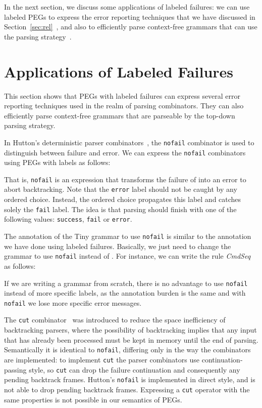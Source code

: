 \documentclass[3p,12pt,singlecolumn]{elsarticle}
\begin{document}
In the next
section, we discuss some applications of labeled failures:
we can use labeled PEGs to express the error
reporting techniques that we have discussed in
Section~\ref{sec:rel}~\cite{hutton1992hfp,rojemo1995epc,partridge1996fv,leijen2001parsec}, and also to efficiently parse
context-free grammars that can use the
 parsing strategy~\cite{parr2011llstar}.


\section{Applications of Labeled Failures}
\label{sec:labelsrelated}

This section shows that PEGs with labeled failures can express
several error reporting techniques used in the realm of parsing
combinators. They can also efficiently parse
context-free grammars that
are parseable by the  top-down parsing strategy.

In Hutton's deterministic parser combinators~\cite{hutton1992hfp}, the \texttt{nofail}
combinator is used to distinguish between failure and error.
We can express the \texttt{nofail} combinators using PEGs with labels
as follows:


That is, \texttt{nofail} is an expression that transforms the failure
of  into an error to abort backtracking.
Note that the \texttt{error} label should not be caught by any
ordered choice.
Instead, the ordered choice propagates this label and catches solely
the \texttt{fail} label.
The idea is that parsing should finish with one of the following
values: \texttt{success}, \texttt{fail} or \texttt{error}.

The annotation of the Tiny grammar to use \texttt{nofail} is
similar to the annotation we have done using labeled failures.
Basically, we just need to change the grammar to use
\texttt{nofail} instead of .
For instance, we can write the rule \textit{CmdSeq} as follows:


If we are writing a grammar from scratch, there is no advantage to
use \texttt{nofail} instead of more specific labels,
as the annotation burden is the same and with \texttt{nofail} we
lose more specific error messages.

The \texttt{cut} combinator~\cite{rojemo1995epc} was introduced
to reduce the space inefficiency of backtracking parsers, where
the possibility of backtracking implies that any input that has already
been processed must be kept in memory until the end of parsing.
Semantically it is identical to {\tt nofail}, differing only
in the way the combinators are implemented: to implement {\tt cut}
the parser combinators use continuation-passing style, so {\tt cut}
can drop the failure continuation and consequently any pending
backtrack frames. Hutton's {\tt nofail} is implemented in direct style,
and is not able to drop pending backtrack frames.
Expressing a {\tt cut} operator with the same properties
is not possible in our semantics of PEGs.
\end{document}
